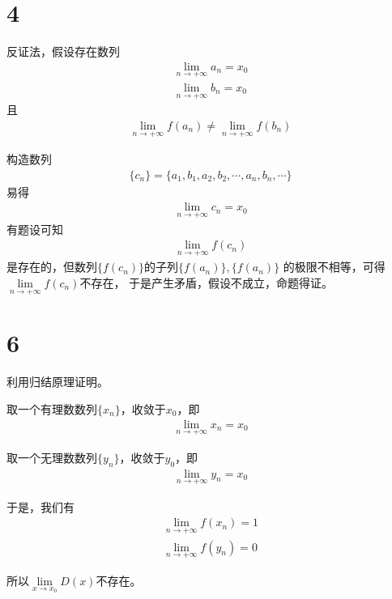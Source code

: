\documentclass{article}
\begin{document}
\section*{4}

反证法，假设存在数列
\begin{align*}
  \lim\limits_{n \to +\infty} a_n = x_0 \\
  \lim\limits_{n \to +\infty} b_n = x_0
\end{align*}
且
\begin{align*}
  \lim\limits_{n \to +\infty} f(a_n) \neq \lim\limits_{n \to +\infty} f(b_n)
\end{align*}

构造数列
\begin{align*}
  \{c_n\} = \{a_1, b_1, a_2, b_2, \cdots, a_n, b_n, \cdots\}
\end{align*}
易得
\begin{align*}
  \lim\limits_{n \to +\infty} c_n = x_0
\end{align*}
有题设可知
\begin{align*}
  \lim\limits_{n \to +\infty} f(c_n)
\end{align*}
是存在的，但数列$\{f(c_n)\}$的子列$\{f(a_n)\}, \{f(a_n)\}$
的极限不相等，可得$\lim\limits_{n \to +\infty} f(c_n)$不存在，
于是产生矛盾，假设不成立，命题得证。

\section*{6}

利用归结原理证明。

取一个有理数数列$\{x_n\}$，收敛于$x_0$，即
\begin{align*}
  \lim\limits_{n \to +\infty} x_n = x_0
\end{align*}

取一个无理数数列$\{y_n\}$，收敛于$y_0$，即
\begin{align*}
  \lim\limits_{n \to +\infty} y_n = x_0
\end{align*}

于是，我们有
\begin{align*}
  \lim\limits_{n \to +\infty} f(x_n) = 1 \\
  \lim\limits_{n \to +\infty} f(y_n) = 0
\end{align*}

所以$\lim\limits_{x \to x_0} D(x)$不存在。
\end{document}
